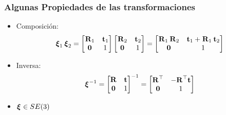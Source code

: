 \begin{frame}
    \frametitle{Algunas Propiedades de las transformaciones}

    \begin{itemize}
        \item Composición:
        \begin{equation*}
            \transform{}{1}\transform{}{2} =
            \begin{bmatrix}
                \rotationCoord{}{1} & \translationCoord{}{1}\\
                \vec{0} & 1
            \end{bmatrix}
            \begin{bmatrix}
                \rotationCoord{}{2} & \translationCoord{}{2}\\
                \vec{0} & 1
            \end{bmatrix} =
            \begin{bmatrix}
                \rotationCoord{}{1}\rotationCoord{}{2} & \translationCoord{}{1}+\rotationCoord{}{1}\translationCoord{}{2}\\
                \vec{0} & 1
            \end{bmatrix}
        \end{equation*}
        
        \item Inversa:
        \begin{equation*}
            \transform{}{}^{-1}=
            \begin{bmatrix}
                \rotation & \translation\\
                \vec{0} & 1
            \end{bmatrix}^{-1} =
            \begin{bmatrix}
                \rotation^{\top} & -\rotation^{\top}\translation\\
                \vec{0} & 1
            \end{bmatrix}
        \end{equation*}
        
        \item $\transform{}{} \in SE(3)$
    \end{itemize}



\end{frame}


